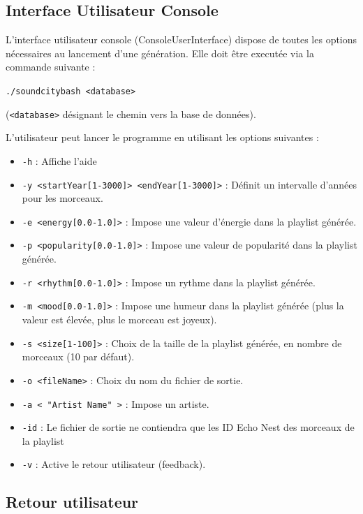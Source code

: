 \subsection{Interface Utilisateur Console}
\label{archi:interface:console}

L'interface utilisateur console (ConsoleUserInterface) dispose de toutes les options 
nécessaires au lancement d'une génération. 
Elle doit être executée via la commande suivante :

\texttt{./soundcitybash <database>}

(\texttt{<database>} désignant le chemin vers la base de données).

\vspace{3mm}
\noindent L'utilisateur peut lancer le programme en utilisant les options suivantes :
\begin{itemize}
\item \texttt{-h} : Affiche l'aide
\item \texttt{-y <startYear[1-3000]> <endYear[1-3000]>} : Définit un intervalle 
d'années pour les morceaux.
\item \texttt{-e <energy[0.0-1.0]>} : Impose une valeur d'énergie dans 
la playlist générée.
\item \texttt{-p <popularity[0.0-1.0]>} : Impose une valeur de popularité 
dans la playlist générée.
\item \texttt{-r <rhythm[0.0-1.0]>} : Impose un rythme dans la 
playlist générée.
\item \texttt{-m <mood[0.0-1.0]>} : Impose une humeur dans la 
playlist générée (plus la valeur est élevée, plus le morceau est joyeux).
\item \texttt{-s <size[1-100]>} : Choix de la taille de la 
playlist générée, en nombre de morceaux (10 par défaut).
\item \texttt{-o <fileName>} : Choix du nom du fichier de sortie.
\item \texttt{-a < "Artist Name" >} : Impose un artiste.
\item \texttt{-id} : Le fichier de sortie ne contiendra que les ID Echo Nest 
des morceaux de la playlist
\item \texttt{-v} : Active le retour utilisateur (feedback).
\end{itemize}

\subsection{Retour utilisateur}
\label{archi:interface:feedback}

